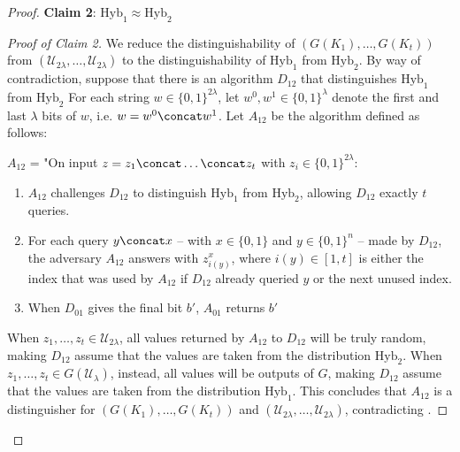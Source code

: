 \documentclass[a4paper, 12pt]{report}
\begin{document}
\begin{proof}
        \textbf{Claim 2}: $\mathrm{Hyb}_1 \approx \mathrm{Hyb}_2$

        \begin{proof}[Proof of Claim 2]
            We reduce the distinguishability of $(G(K_1), \ldots, G(K_t))$ from $(\mathcal{U}_{2\lambda}, \ldots, \mathcal{U}_{2\lambda})$ to the distinguishability of $\mathrm{Hyb}_1$ from $\mathrm{Hyb}_2$. By way of contradiction, suppose that there is an algorithm $D_{12}$ that distinguishes $\mathrm{Hyb}_1$ from $\mathrm{Hyb}_{2}$
            For each string $w \in \{0,1\}^{2\lambda}$, let $w^0, w^1 \in \{0,1\}^{\lambda}$ denote the first and last $\lambda$ bits of $w$, i.e. $w = w^0 \concat w^1$. Let $A_{12}$ be the algorithm defined as follows:

            $A_{12}$ = "On input $z = z_1 \concat \ldots \concat z_t$ with $z_i \in \{0,1\}^{2\lambda}$:

            \begin{enumerate}
                \item $A_{12}$ challenges $D_{12}$ to distinguish $\mathrm{Hyb}_1$ from $\mathrm{Hyb}_2$, allowing $D_{12}$ exactly $t$ queries.
                \item For each query $y \concat x$ -- with $x \in \{0,1\}$ and $y \in \{0,1\}^n$ -- made by $D_{12}$, the adversary $A_{12}$ answers with $z^x_{i(y)}$, where $i(y) \in [1,t]$ is either the index that was used by $A_{12}$ if $D_{12}$ already queried $y$ or the next unused index.
                \item When $D_{01}$ gives the final bit $b'$, $A_{01}$ returns $b'$
            \end{enumerate}

            When $z_1, \ldots, z_t \in \mathcal{U}_{2\lambda}$, all values returned by $A_{12}$ to $D_{12}$ will be truly random, making $D_{12}$ assume that the values are taken from the distribution $\mathrm{Hyb}_2$. When $z_1, \ldots, z_t \in G(\mathcal{U}_{\lambda})$, instead, all values will be outputs of $G$, making $D_{12}$ assume that the values are taken from the distribution $\mathrm{Hyb}_1$. This concludes that $A_{12}$ is a distinguisher for $(G(K_1), \ldots, G(K_t))$ and $(\mathcal{U}_{2\lambda}, \ldots, \mathcal{U}_{2\lambda})$, contradicting .
        \end{proof}
    \end{proof}
\end{document}
